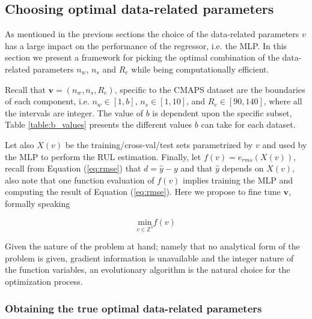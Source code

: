 \documentclass[12pt]{IEEEtran}%
\begin{document}
\subsection{Choosing optimal data-related parameters}
\label{sec:choosing_otimal_data-related_params}

As mentioned in the previous sections the choice of the data-related
parameters $v$ has a large impact on the performance of the regressor, i.e.
the MLP. In this section we present a framework for picking the optimal
combination of the data-related parameters $n_{w}$, $n_{s}$ and $R_{e}$ while
being computationally efficient.

Recall that $\mathbf{v} = (n_{w}, n_{s}, R_{e})$, specific to the CMAPS
dataset are the boundaries of each component, i.e. $n_{w} \in\left[  1,
b\right]  $, $n_{s} \in\left[  1, 10\right]  $, and $R_{e} \in\left[  90, 140
\right]  $, where all the intervals are integer. The value of $b$ is dependent
upon the specific subset, Table \ref{table:b_values} presents the different
values $b$ can take for each dataset.

Let also $X(v)$ be the training/cross-val/test sets parametrized by $v$ and
used by the MLP to perform the RUL estimation. Finally, let $f(v)=e_{rms}%
(X(v))$, recall from Equation (\ref{eq:rmse}) that $d = \hat{y} - y$ and that
$\hat{y}$ depends on $X(v)$, also note that one function evaluation of $f(v)$
implies training the MLP and computing the result of Equation (\ref{eq:rmse}).
Here we propose to fine tune $\mathbf{v}$, formally speaking%

\begin{equation}
\underset{v \in \mathbb{Z}^3}{\mathrm{min}}  f(v)
\label{eq:optimization_problem}%
\end{equation}


Given the nature of the problem at hand; namely that no analytical form of the
problem is given, gradient information is unavailable and the integer nature
of the function variables, an evolutionary algorithm is the natural choice for
the optimization process.

\subsubsection{Obtaining the true optimal data-related parameters}
\end{document}
